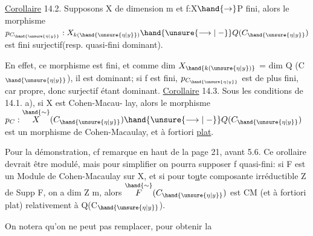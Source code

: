 \uline{Corollaire} 14.2. Supposons X de dimension m et f:X$\hand{\to}$P fini, alors
le morphisme $p_{C_{\hand{\unsure{\eta|y}}}} : X_{k(\hand{\unsure{\eta|y}})} \hand{\unsure{\longrightarrow|\relbar}} Q(C_{\hand{\unsure{\eta|y}}})$ est fini surjectif(resp. quasi-fini
dominant).

En effet, ce morphisme est fini, et comme dim $X_{\hand{k(\unsure{\eta|y})}}$ = dim Q (C$_{\hand{\unsure{\eta|y}}}$), il est
dominant;  si f est fini, $p_{C_{\hand{\unsure{\eta|y}}}}$ est de plus fini,
 car propre, donc surjectif étant dominant.
\uline{Corollaire} 14.3. Sous les conditions de 14.1. a), si X est Cohen-Macau-%
lay, alors le morphisme $p_{C} : \overset{\hand{\sim}}{X}(C_{\hand{\unsure{\eta|y}}}) \hand{\unsure{\longrightarrow|\relbar}} Q(C_{\hand{\unsure{\eta|y}}})$ est un morphisme de
Cohen-Macaulay, et à fortiori \uline{plat}.

Pour la démonstration, cf remarque en haut de la page 21, avant 5.6.
Ce orollaire devrait être modulé, mais pour simplifier on pourra
supposer f quasi-fini: si F est un Module de Cohen-Macaulay sur X, et si
pour to\uline{u}te composante irréductible Z de Supp F, on a dim Z \hand{$\geqslant$} m, alors
$\overset{\hand{\sim}}{F}(C_{\hand{\unsure{\eta|y}}})$ est CM (et à fortiori plat) relativement à Q(C$_{\hand{\unsure{\eta|y}}}$).

On notera qu'on ne peut pas remplacer, pour obtenir la

